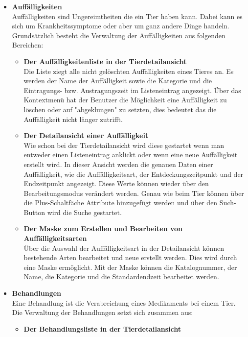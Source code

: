 \begin{itemize}
\item{\textbf{Auffälligkeiten}} \\
Auffälligkeiten sind Ungereimtheiten die ein Tier haben kann. Dabei kann es sich um Krankheitssymptome oder aber um ganz andere Dinge handeln. \\ 
Grundsätzlich besteht die Verwaltung der Auffälligkeiten aus folgenden Bereichen:
\begin{itemize}
\item{\textbf{Der Auffälligkeitenliste in der Tierdetailansicht}} \\
Die Liste ziegt alle nicht gelöschten Auffälligkeiten eines Tieres an. Es werden der Name der Auffälligkeit sowie die Kategorie und die Eintragungs- bzw. Austragungszeit im Listeneintrag angezeigt. Über das Kontextmenü hat der Benutzer die Möglichkeit eine Auffälligkeit zu löschen oder auf "abgeklungen" zu setzten, dies bedeutet das die Auffälligkeit nicht länger zutrifft.
\item{\textbf{Der Detailansicht einer Auffälligkeit}} \\
Wie schon bei der Tierdetailansicht wird diese gestartet wenn man entweder einen Listeneintrag anklickt oder wenn eine neue Auffälligkeit erstellt wird. In dieser Ansicht werden die genauen Daten einer Auffälligkeit, wie die Auffälligkeitsart, der Entdeckungszeitpunkt und der Endzeitpunkt angezeigt. Diese Werte können wieder über den Bearbeitungsmodus verändert werden. Genau wie beim Tier können über die Plus-Schaltfäche Attribute hinzugefügt werden und über den Such-Button wird die Suche gestartet.
\item{\textbf{Der Maske zum Erstellen und Bearbeiten von Auffälligkeitsarten}} \\
Über die Auswahl der Auffälligkeitsart in der Detailansicht können bestehende Arten bearbeitet und neue erstellt werden. Dies wird durch eine Maske ermöglicht. Mit der Maske können die Katalognummer, der Name, die Kategorie und die Standardendzeit bearbeitet werden.
\end{itemize}
\item{\textbf{Behandlungen}} \\
Eine Behandlung ist die Verabreichung eines Medikaments bei einem Tier. \\
Die Verwaltung der Behandlungen setzt sich zusammen aus:
\begin{itemize}
\item{\textbf{Der Behandlungsliste in der Tierdetailansicht}} \\

\end{itemize}
\end{itemize}
